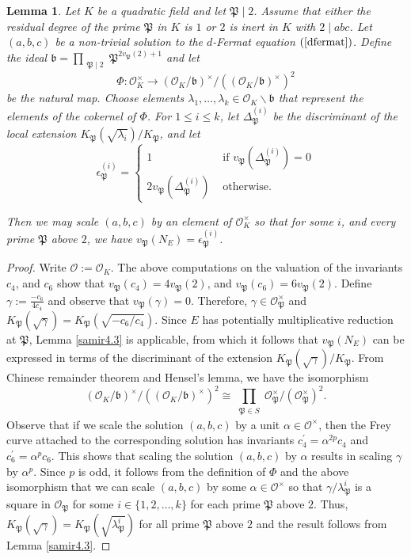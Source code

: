 \documentclass[]{article}
\newtheorem{lemma}{Lemma}
\newcommand {\mcalO}{{\mathcal{O}}}
\newcommand {\mfp}{{\mathfrak{P}}}
\newcounter{cases}
\begin{document}
\begin{lemma}\label{samir4.4}
    Let $K$ be a quadratic field and let $\mfp\mid 2$. Assume that either the residual degree of the prime $\mfp$ in $K$ is $1$ or $2$ is inert in $K$ with $2\mid abc$. Let $(a,b,c)$ be a non-trivial solution to the $d$-Fermat equation $(\ref{dfermat})$. Define the ideal $\mathfrak{b}=\prod_{\substack{\mfp \mid 2  }}\mfp^{2v_{\mfp}(2)+1}$ and let $$
\Phi: \mathcal{O}_K^{\times} \rightarrow\left(\mathcal{O}_K / \mathfrak{b}\right)^{\times} /\left(\left(\mathcal{O}_K / \mathfrak{b}\right)^{\times}\right)^2
$$
be the natural map. Choose elements $\lambda_1, \ldots, \lambda_k \in \mathcal{O}_K \backslash \mathfrak{b}$ that represent the elements of the cokernel of $\Phi$. For $1 \leq i \leq k$, let $\Delta_{\mfp}^{(i)}$ be the discriminant of the local extension $K_{\mfp}\left(\sqrt{\lambda_i}\right) / K_{\mfp}$, and let
$$
\epsilon_{\mfp}^{(i)}= \begin{cases}1 & \text { if } v_{\mfp}\left(\Delta_{\mfp}^{(i)}\right)=0 \\ 2 v_{\mfp}\left(\Delta_{\mfp}^{(i)}\right) & \text { otherwise. }\end{cases}
$$

Then we may scale $(a, b, c)$ by an element of $\mathcal{O}_K^{\times}$ so that for some $i$, and every prime $\mfp$ above $2$, we have $v_{\mfp}(N_E)=\epsilon_{\mfp}^{(i)}$.
\end{lemma}

\begin{proof}
    Write $\mcalO:=\mcalO_K$. The above computations on the valuation of the invariants $c_4$, and $c_6$ show that $v_{\mfp}(c_4)=4v_{\mfp}(2)$, and $v_{\mfp}(c_6)=6v_{\mfp}(2)$. Define $\gamma:=\frac{-c_6}{4c_4}$ and observe that $v_{\mfp}(\gamma)=0$. Therefore, $\gamma\in \mcalO_{\mfp}^{\times}$ and $K_{\mfp}(\sqrt{\gamma})=K_{\mfp}(\sqrt{-c_6/c_4})$. Since $E$ has potentially multiplicative reduction at $\mfp$, Lemma \ref{samir4.3} is applicable, from which it follows that $v_{\mfp}(N_E)$ can be expressed in terms of the discriminant of the extension $K_{\mfp}(\sqrt{\gamma})/K_{\mfp}$. From Chinese remainder theorem and Hensel's lemma, we have the isomorphism $$\left(\mathcal{O}_K / \mathfrak{b}\right)^{\times} /\left(\left(\mathcal{O}_K / \mathfrak{b}\right)^{\times}\right)^2 \cong \prod_{\substack{\mathfrak{\mfp} \in S  }} \mcalO_{\mfp}^{\times} / (\mcalO_{\mfp}^{\times})^2.$$Observe that if we scale the solution $(a,b,c)$ by a unit $\alpha \in \mcalO^{\times}$, then the Frey curve attached to the corresponding solution has invariants $c_4^{\prime}=\alpha^{2p}c_4$ and $c_6^{\prime}=\alpha^{p}c_6$. This shows that scaling the solution $(a,b,c)$ by $\alpha$ results in scaling $\gamma$ by $\alpha^p$. Since $p$ is odd, it follows
from the definition of $\Phi$ and the above isomorphism that we can scale $(a, b, c)$ by some $\alpha\in \mcalO^{\times}$ so that $\gamma / \lambda_{\mfp}^i$ is a square in $\mcalO_{\mfp}$ for some $i\in \{1,2,\ldots,k\}$ for each prime $\mfp$ above $2$. Thus, $K_{\mfp}(\sqrt{\gamma})=K_{\mfp}\left(\sqrt{\lambda_{\mfp}^i}\right)$ for all prime $\mfp$ above $2$ and the result follows from Lemma \ref{samir4.3}.
\end{proof}
\end{document}
